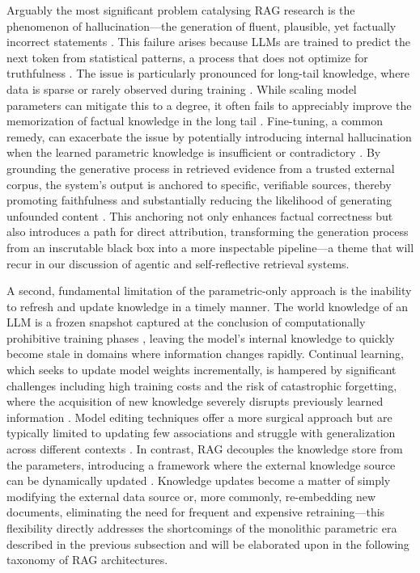 \documentclass[11pt,a4paper]{article}
\begin{document}
Arguably the most significant problem catalysing RAG research is the phenomenon of hallucination---the generation of fluent, plausible, yet factually incorrect statements \cite{arxiv:2312.10997v5}. This failure arises because LLMs are trained to predict the next token from statistical patterns, a process that does not optimize for truthfulness \cite{arxiv:2404.10981v1}. The issue is particularly pronounced for long-tail knowledge, where data is sparse or rarely observed during training \cite{arxiv:2212.10511v4}. While scaling model parameters can mitigate this to a degree, it often fails to appreciably improve the memorization of factual knowledge in the long tail \cite{arxiv:2212.10511v4}. Fine-tuning, a common remedy, can exacerbate the issue by potentially introducing internal hallucination when the learned parametric knowledge is insufficient or contradictory \cite{arxiv:2311.08401v1}. By grounding the generative process in retrieved evidence from a trusted external corpus, the system's output is anchored to specific, verifiable sources, thereby promoting faithfulness and substantially reducing the likelihood of generating unfounded content \cite{arxiv:2005.11401v4,arxiv:2310.11511v1}. This anchoring not only enhances factual correctness but also introduces a path for direct attribution, transforming the generation process from an inscrutable black box into a more inspectable pipeline---a theme that will recur in our discussion of agentic and self-reflective retrieval systems.

A second, fundamental limitation of the parametric-only approach is the inability to refresh and update knowledge in a timely manner. The world knowledge of an LLM is a frozen snapshot captured at the conclusion of computationally prohibitive training phases \cite{arxiv:2310.12321v1}, leaving the model's internal knowledge to quickly become stale in domains where information changes rapidly. Continual learning, which seeks to update model weights incrementally, is hampered by significant challenges including high training costs and the risk of catastrophic forgetting, where the acquisition of new knowledge severely disrupts previously learned information \cite{arxiv:2402.01364v2}. Model editing techniques offer a more surgical approach but are typically limited to updating few associations and struggle with generalization across different contexts \cite{arxiv:2210.07229v2,arxiv:2206.06520v1}. In contrast, RAG decouples the knowledge store from the parameters, introducing a framework where the external knowledge source can be dynamically updated \cite{arxiv:2005.11401v4}. Knowledge updates become a matter of simply modifying the external data source or, more commonly, re-embedding new documents, eliminating the need for frequent and expensive retraining---this flexibility directly addresses the shortcomings of the monolithic parametric era described in the previous subsection and will be elaborated upon in the following taxonomy of RAG architectures.
\end{document}
